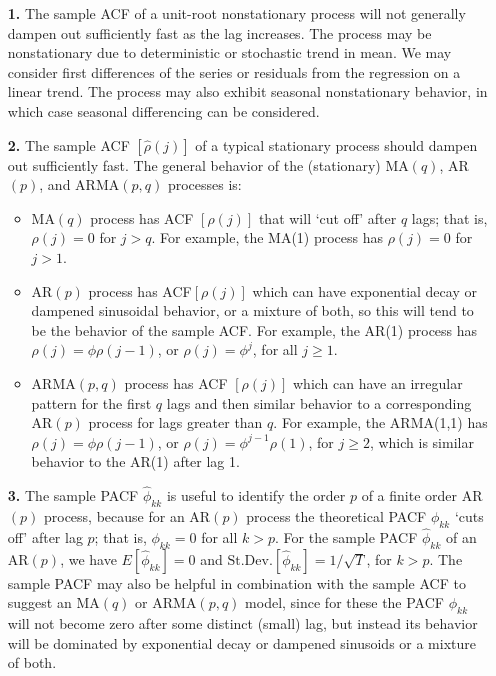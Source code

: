 \begin{enumerate}
\item[\textbf{1.}] The sample ACF of a unit-root nonstationary process will not generally dampen out sufficiently fast as the lag increases. The process may be nonstationary due to deterministic or stochastic trend in mean. We may consider first differences of the series or residuals from the regression on a linear trend. The process may also exhibit seasonal nonstationary behavior, in which case seasonal differencing can be considered. 

\item[\textbf{2.}] The sample ACF $[\hat{\rho}(j)]$ of a typical stationary process should dampen out sufficiently fast. The general behavior of the (stationary) MA$(q)$, AR$(p)$, and ARMA$(p,q)$ processes is: 

\begin{itemize}
\item MA$(q)$ process has ACF $[\rho(j)]$ that will `cut off' after $q$ lags; that is, $\rho(j) = 0$ for $j > q$. For example, the MA(1) process has $\rho(j)= 0$ for $j > 1$.

\item AR$(p)$ process has ACF$[\rho(j)]$ which can have exponential decay or dampened sinusoidal behavior, or a mixture of both, so this will tend to be the behavior of the sample ACF. For example, the AR(1) process has $\rho(j)=\phi \rho(j-1)$,  or $\rho(j) = \phi^j$, for all $j \geq 1$.

\item ARMA$(p,q)$ process has ACF $[\rho(j)]$ which can have an irregular pattern for the first $q$ lags and then similar behavior to a corresponding AR$(p)$ process for lags greater than $q$. For example, the ARMA(1,1) has $\rho(j) = \phi \rho(j-1)$, or $\rho(j)= \phi^{j-1} \rho(1)$, for $j \geq 2$, which is similar behavior to the AR(1) after lag 1.
\end{itemize}

\item[\textbf{3.}] The sample PACF $\hat{\phi}_{kk}$ is useful to identify the order $p$ of a finite order AR$(p)$ process, because for an AR$(p)$ process the theoretical PACF $\phi_{kk}$ `cuts off' after lag $p$; that is, $\phi_{kk}= 0$ for all $k>p$. For the sample PACF $\hat{\phi}_{kk}$ of an AR$(p)$, we have $E[\hat{\phi}_{kk}]= 0$ and $\text{St.Dev.}[\hat{\phi}_{kk}]=1 / \sqrt{T}$, for $k > p$. The sample PACF may also be helpful in combination with the sample ACF to suggest an MA$(q)$ or ARMA$(p,q)$ model, since for these the PACF $\phi_{kk}$ will not become zero after some distinct (small) lag, but instead its behavior will be dominated by exponential decay or dampened sinusoids or a mixture of both.
\end{enumerate}


